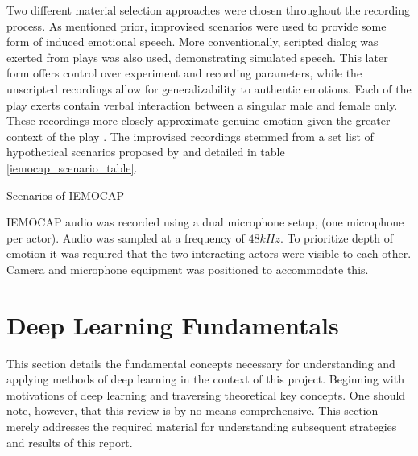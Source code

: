 Two different material selection approaches were chosen throughout the recording process. As mentioned prior, improvised scenarios were used to provide some form of induced emotional speech. More conventionally, scripted dialog was exerted from plays was also used, demonstrating simulated speech. This later form offers control over experiment and recording parameters, while the unscripted recordings allow for generalizability to authentic emotions. Each of the play exerts contain verbal interaction between a singular male and female only. These recordings more closely approximate genuine emotion given the greater context of the play \cite{IEMOCAP_doc}. The improvised recordings stemmed from a set list of hypothetical scenarios proposed by \cite{scherer1986experiencing} and detailed in table \ref{iemocap_scenario_table}.
\begin{table}[]

    \caption{Scenarios of IEMOCAP \cite{IEMOCAP_doc}}
    \label{iemocap_scenario_table}
\end{table}
IEMOCAP audio was recorded using a dual microphone setup, (one microphone per actor). Audio was sampled at a frequency of $48kHz$. To prioritize depth of emotion it was required that the two interacting actors were visible to each other. Camera and microphone equipment was positioned to accommodate this.

\section{Deep Learning Fundamentals}
This section details the fundamental concepts necessary for understanding and applying methods of deep learning in the context of this project. Beginning with motivations of deep learning and traversing theoretical key concepts. One should note, however, that this review is by no means comprehensive. This section merely addresses the required material for understanding subsequent strategies and results of this report.\\ \\

